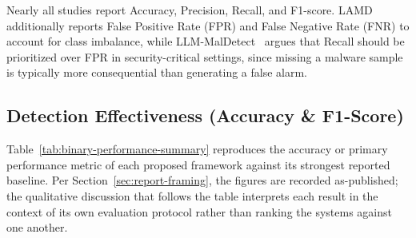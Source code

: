 Nearly all studies report Accuracy, Precision, Recall, and F1-score. LAMD~\cite{Qian2025-ua} additionally reports False Positive Rate (FPR) and False Negative Rate (FNR) to account for class imbalance, while LLM-MalDetect~\cite{Feng2025-ry} argues that Recall should be prioritized over FPR in security-critical settings, since missing a malware sample is typically more consequential than generating a false alarm.

\subsection{Detection Effectiveness (Accuracy \& F1-Score)}

Table~\ref{tab:binary-performance-summary} reproduces the accuracy or primary performance metric of each proposed framework against its strongest reported baseline. Per Section~\ref{sec:report-framing}, the figures are recorded as-published; the qualitative discussion that follows the table interprets each result in the context of its own evaluation protocol rather than ranking the systems against one another.

\begin{table}[htbp]
\centering
\caption{Binary classification performance as reported in each study. Figures are reproduced from the original papers; cross-study ranking is not warranted because datasets, VT thresholds, and split strategies differ (see Table~\ref{tab:rq4_summary}).}
\label{tab:binary-performance-summary}
\end{table}

